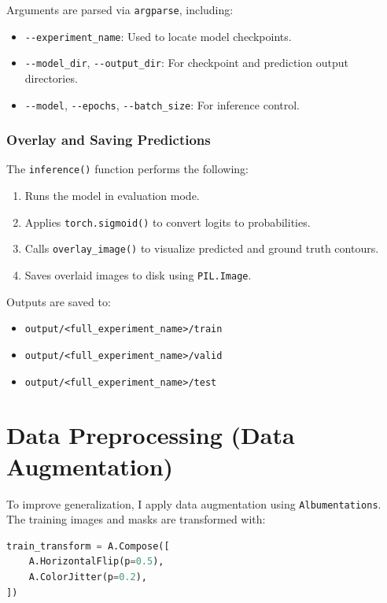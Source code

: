 \documentclass{homework}
\begin{document}
Arguments are parsed via \lstinline{argparse}, including:
\begin{itemize}
    \item \lstinline{--experiment_name}: Used to locate model checkpoints.
    \item \lstinline{--model_dir}, \lstinline{--output_dir}: For checkpoint and prediction output directories.
    \item \lstinline{--model}, \lstinline{--epochs}, \lstinline{--batch_size}: For inference control.
\end{itemize}

\subsubsection{Overlay and Saving Predictions}

The \lstinline{inference()} function performs the following:

\begin{enumerate}
    \item Runs the model in evaluation mode.
    \item Applies \lstinline{torch.sigmoid()} to convert logits to probabilities.
    \item Calls \lstinline{overlay_image()} to visualize predicted and ground truth contours.
    \item Saves overlaid images to disk using \lstinline{PIL.Image}.
\end{enumerate}

Outputs are saved to:
\begin{itemize}
    \item \lstinline{output/<full_experiment_name>/train}
    \item \lstinline{output/<full_experiment_name>/valid}
    \item \lstinline{output/<full_experiment_name>/test}
\end{itemize}

\section{Data Preprocessing (Data Augmentation)}

To improve generalization, I apply data augmentation using \lstinline{Albumentations}. The training images and masks are transformed with:

\begin{lstlisting}[language=Python]
train_transform = A.Compose([
    A.HorizontalFlip(p=0.5),
    A.ColorJitter(p=0.2),
])
\end{lstlisting}
\end{document}
